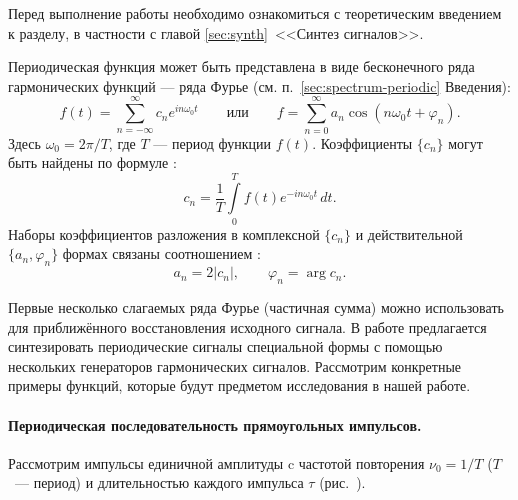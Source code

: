 


Перед выполнение работы необходимо ознакомиться с теоретическим введением
к разделу, в частности с главой \ref{sec:synth}~<<Синтез сигналов>>.


Периодическая функция может быть представлена в виде бесконечного ряда
гармонических функций --- ряда Фурье (см. п.~\ref{sec:spectrum-periodic}
Введения):
\begin{equation*}
f(t) = \sum_{n=-\infty}^{\infty} c_n e^{in\omega_0 t}\qquad\text{или}\qquad
f=\sum_{n=0}^{\infty} a_n \cos (n\omega_0 t + \varphi_n).
\end{equation*}
Здесь $\omega_0 = 2\pi/T$, где $T$ --- период функции $f(t)$.
Коэффициенты $\{c_n\}$ могут быть найдены по формуле
:
\begin{equation*}
    c_n=\frac{1}{T}\int\limits_{0}^{T} f(t)e^{-in\omega_0 t}\,dt.
\end{equation*}
Наборы коэффициентов разложения в комплексной $\{c_n\}$ и действительной
$\{a_n,\varphi_n\}$ формах связаны соотношением :
\begin{equation*}
a_n = 2|c_n|,\qquad \varphi_n = \arg c_n.
\end{equation*}

Первые несколько слагаемых ряда Фурье (частичная сумма) можно использовать
для приближённого восстановления исходного сигнала.
В работе предлагается синтезировать периодические сигналы специальной формы
с помощью нескольких генераторов гармонических сигналов.
Рассмотрим конкретные примеры функций, которые будут предметом
исследования в нашей работе.

\paragraph{Периодическая последовательность прямоугольных импульсов.}
Рассмотрим импульсы единичной амплитуды c частотой повторения
$\nu_{0}=1/T$ ($T$~--- период) и длительностью каждого
импульса $\tau$ (рис.~).

